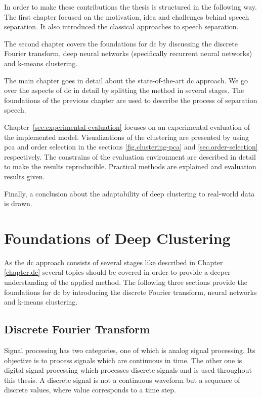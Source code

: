 In order to make these contributions the thesis is structured in the following way.
The first chapter focused on the motivation, idea and challenges behind speech separation. It also introduced the classical approaches to speech separation.

The second chapter covers the foundations for \gls{dc} by discussing the discrete Fourier transform, deep neural networks (specifically recurrent neural networks) and k-means clustering.

The main chapter goes in detail about the state-of-the-art \gls{dc} approach. We go over the aspects of \gls{dc} in detail by splitting the method in several stages. The foundations of the previous chapter are used to describe the process of separation speech.

Chapter~\ref{sec.experimental-evaluation} focuses on an experimental evaluation of the implemented model. Visualizations of the clustering are presented by using \gls{pca} and order selection in the sections \ref{fig.clustering-pca} and \ref{sec.order-selection} respectively. The constrains of the evaluation environment are described in detail to make the results reproducible. Practical methods are explained and evaluation results given.

Finally, a conclusion about the adaptability of deep clustering to real-world data is drawn.

\chapter{Foundations of Deep Clustering}

As the \gls{dc} approach consists of several stages like described in Chapter \ref{chapter.dc} several topics should be covered in order to provide a deeper understanding of the applied method.
The following three sections provide the foundations for \gls{dc} by introducing the discrete Fourier transform, neural networks and k-means clustering.

\section{Discrete Fourier Transform}\label{sec.foundation-dsp}


Signal processing has two categories, one of which is analog signal processing. Its objective is to process signals which are continuous in time. The other one is digital signal processing which processes discrete signals and is used throughout this thesis.
A discrete signal is not a continuous waveform but a sequence of discrete values, where value corresponds to a time step.~\cite[p.~2]{Lyons1997}


